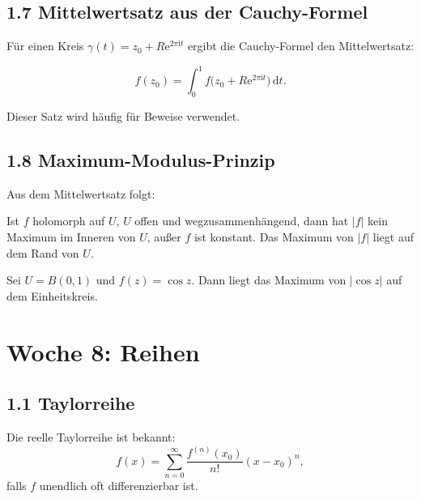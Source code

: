 \documentclass[11pt,a4paper]{article}
\newcommand{\ii}{\mathrm i}
\newcommand{\ee}{\mathrm e}
\newcommand{\dd}{\,\mathrm d}
\begin{document}
\subsection{1.7 Mittelwertsatz aus der Cauchy-Formel}
Für einen Kreis $\gamma(t)=z_0+R\ee^{2\pi\ii t}$ ergibt die Cauchy-Formel den Mittelwertsatz:
\begin{importantbox}
\[
f(z_0)=\int_0^1 f\bigl(z_0+R\ee^{2\pi\ii t}\bigr)\dd t.
\]
\end{importantbox}
Dieser Satz wird häufig für Beweise verwendet.

\subsection{1.8 Maximum-Modulus-Prinzip}
Aus dem Mittelwertsatz folgt:
\begin{importantbox}
Ist $f$ holomorph auf $U$, $U$ offen und wegzusammenhängend, dann hat $|f|$ kein Maximum im Inneren von $U$, außer $f$ ist konstant. Das Maximum von $|f|$ liegt auf dem Rand von $U$.
\end{importantbox}

\begin{center}
\end{center}

\begin{beispielbox}
Sei $U=B(0,1)$ und $f(z)=\cos z$. Dann liegt das Maximum von $|\cos z|$ auf dem Einheitskreis.
\end{beispielbox}

\section{Woche 8: Reihen}

\subsection{1.1 Taylorreihe}
Die reelle Taylorreihe ist bekannt:
\[
f(x)=\sum_{n=0}^{\infty}\frac{f^{(n)}(x_0)}{n!}(x-x_0)^n,
\]
falls $f$ unendlich oft differenzierbar ist.
\end{document}
